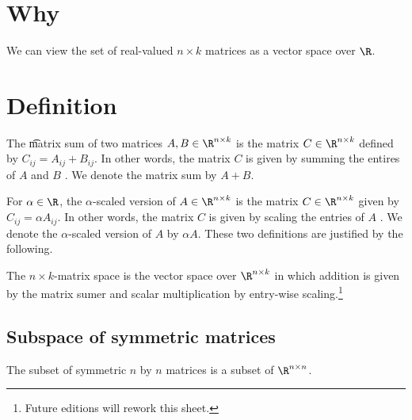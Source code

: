 

\section*{Why}

We can view the set of real-valued $n \times k$ matrices as a vector space over $\R $.

\section*{Definition}

The \t{matrix sum} of two matrices $A, B \in \R ^{n \times k}$ is the matrix $C \in \R ^{n \times k}$ defined by $C_{ij} = A_{ij} + B_{ij}$.
In other words, the matrix $C$ is given by summing the entires of $A$ and $B$ .
We denote the matrix sum by $A + B$.

For $\alpha  \in \R $, the \t{$\alpha $-scaled version} of $A \in \R ^{n \times k}$ is the matrix $C \in \R ^{n \times k}$ given by $C_{ij} = \alpha  A_{ij}$.
In other words, the matrix $C$ is given by scaling the entries of $A$ .
We denote the $\alpha $-scaled version of $A$ by $\alpha  A$.
These two definitions are justified by the following.

The \t{$n \times k$-matrix space} is the vector space over $\R ^{n \times  k}$ in which addition is given by the matrix sumer and scalar multiplication by entry-wise scaling.\footnote{Future editions will rework this sheet.}

\subsection*{Subspace of symmetric matrices}

The subset of symmetric $n$ by $n$ matrices is a subset of $\R ^{n \times n}$.

\blankpage